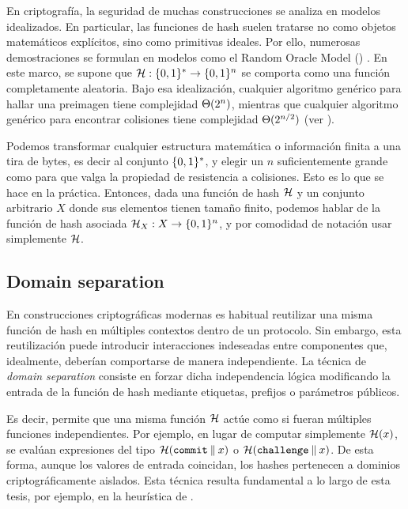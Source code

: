 En criptografía, la seguridad de muchas construcciones se analiza en modelos idealizados. En particular, las funciones de hash suelen tratarse no como objetos matemáticos explícitos, sino como primitivas ideales. Por ello, numerosas demostraciones se formulan en modelos como el Random Oracle Model (\ROM) \cite{Bellare1993}. En este marco, se supone que $\mathcal{H}: \{0,1\}^{*} \to \{0,1\}^{n}$ se comporta como una función completamente aleatoria. Bajo esa idealización, cualquier algoritmo genérico para hallar una preimagen tiene complejidad $\Theta(2^n)$, mientras que cualquier algoritmo genérico para encontrar colisiones tiene complejidad $\Theta(2^{n/2})$ (ver \cite{hac}).

Podemos transformar cualquier estructura matemática o información finita a una tira de bytes, es decir al conjunto $\{0,1\}^{*}$, y elegir un $n$ suficientemente grande como para que valga la propiedad de resistencia a colisiones. Esto es lo que se hace en la práctica. Entonces, dada una función de hash $\mathcal{H}$ y un conjunto arbitrario $X$ donde sus elementos tienen tamaño finito, podemos hablar de la función de hash asociada $\mathcal{H}_X: X \to \{0,1\}^{n}$, y por comodidad de notación usar simplemente $\mathcal{H}$.

\subsection{Domain separation}
\label{subsec:apendice-a-hashes-domain-separation}

En construcciones criptográficas modernas es habitual reutilizar una misma función de hash en múltiples contextos dentro de un protocolo. Sin embargo, esta reutilización puede introducir interacciones indeseadas entre componentes que, idealmente, deberían comportarse de manera independiente. La técnica de \textit{domain separation} consiste en forzar dicha independencia lógica modificando la entrada de la función de hash mediante etiquetas, prefijos o parámetros públicos.

Es decir, permite que una misma función $\mathcal{H}$ actúe como si fueran múltiples funciones independientes. Por ejemplo, en lugar de computar simplemente $\mathcal{H}(x)$, se evalúan expresiones del tipo $\mathcal{H}(\texttt{commit} \mathbin{\|} x)$ o $\mathcal{H}(\texttt{challenge} \mathbin{\|} x)$. De esta forma, aunque los valores de entrada coincidan, los hashes pertenecen a dominios criptográficamente aislados. Esta técnica resulta fundamental a lo largo de esta tesis, por ejemplo, en la heurística de \FiatShamir.

